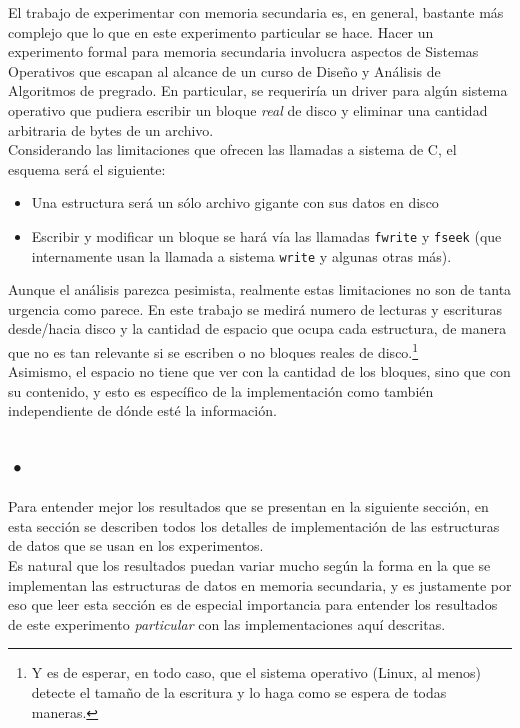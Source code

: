 \documentclass[12pt,letterpaper]{report}
\begin{document}
El trabajo de experimentar con memoria secundaria es, en general, bastante más complejo que lo que en este experimento particular se hace. Hacer un experimento formal para memoria secundaria involucra aspectos de Sistemas Operativos que escapan al alcance de un curso de Diseño y Análisis de Algoritmos de pregrado. En particular, se requeriría un driver para algún sistema operativo que pudiera escribir un bloque \emph{real} de disco y eliminar una cantidad arbitraria de bytes de un archivo.\\

Considerando las limitaciones que ofrecen las llamadas a sistema de C, el esquema será el siguiente:

\begin{itemize}
\item Una estructura será un sólo archivo gigante con sus datos en disco
\item Escribir y modificar un bloque se hará vía las llamadas \texttt{fwrite} y \texttt{fseek} (que internamente usan la llamada a sistema \texttt{write} y algunas otras más).
\end{itemize}

Aunque el análisis parezca pesimista, realmente estas limitaciones no son de tanta urgencia como parece. En este trabajo se medirá numero de lecturas y escrituras desde/hacia disco y la cantidad de espacio que ocupa cada estructura, de manera que no es tan relevante si se escriben o no bloques reales de disco.\footnote{Y es de esperar, en todo caso, que el sistema operativo (Linux, al menos) detecte el tamaño de la escritura y lo haga como se espera de todas maneras.}\\

Asimismo, el espacio no tiene que ver con la cantidad de los bloques, sino que con su contenido, y esto es específico de la implementación como también independiente de dónde esté la información.


\subsection{•}


Para entender mejor los resultados que se presentan en la siguiente sección, en esta sección se describen todos los detalles de implementación de las estructuras de datos que se usan en los experimentos.\\

Es natural que los resultados puedan variar mucho según la forma en la que se implementan las estructuras de datos en memoria secundaria, y es justamente por eso que leer esta sección es de especial importancia para entender los resultados de este experimento \emph{particular} con las implementaciones aquí descritas.
\end{document}
